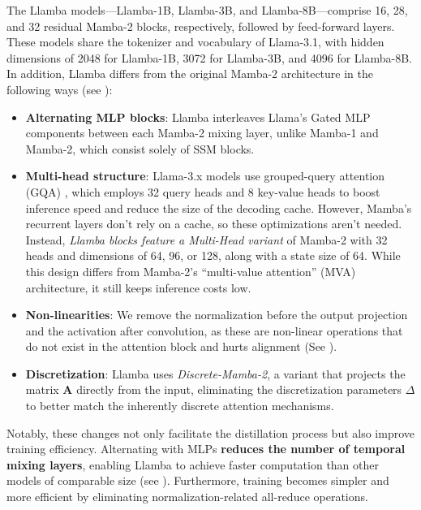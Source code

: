 The Llamba models—Llamba-1B, Llamba-3B, and Llamba-8B—comprise 16, 28, and 32 residual Mamba-2 blocks, respectively, followed by feed-forward layers. These models share the tokenizer and vocabulary of Llama-3.1, with hidden dimensions of 2048 for Llamba-1B, 3072 for Llamba-3B, and 4096 for Llamba-8B. 
In addition, Llamba differs from the original Mamba-2 architecture \citep{mamba2} in the following ways (see ):
\begin{itemize}[leftmargin=*]

\item \textbf{Alternating MLP blocks}:
Llamba interleaves Llama’s Gated MLP components between each Mamba-2 mixing layer, unlike Mamba-1 and Mamba-2, which consist solely of SSM blocks.

\item \textbf{Multi-head structure}: Llama-3.x models use grouped-query attention (GQA) \citep{gqa, mqa}, which employs 32 query heads and 8 key-value heads to boost inference speed and reduce the size of the decoding cache. However, Mamba’s recurrent layers don’t rely on a cache, so these optimizations aren’t needed. Instead, \textit{Llamba blocks feature a Multi-Head variant} of Mamba-2 with 32 heads and dimensions of 64, 96, or 128, along with a state size of 64. While this design differs from Mamba-2’s ``multi-value attention'' (MVA) architecture, it still keeps inference costs low.

\item \textbf{Non-linearities}: We remove the normalization before the output projection and the activation after convolution, as these are non-linear operations that do not exist in the attention block and hurts alignment (See ). 

\item \textbf{Discretization}: Llamba uses \textit{Discrete-Mamba-2}, a variant that projects the matrix $\mathbf{A}$ directly from the input, eliminating the discretization parameters $\Delta$ to better match the inherently discrete attention mechanisms. 
\end{itemize}

Notably, these changes not only facilitate the distillation process but also improve training efficiency. Alternating with MLPs \textbf{reduces the number of temporal mixing layers}, enabling Llamba to achieve faster computation than other models of comparable size (see ). Furthermore, training becomes simpler and more efficient by eliminating normalization-related all-reduce operations.
